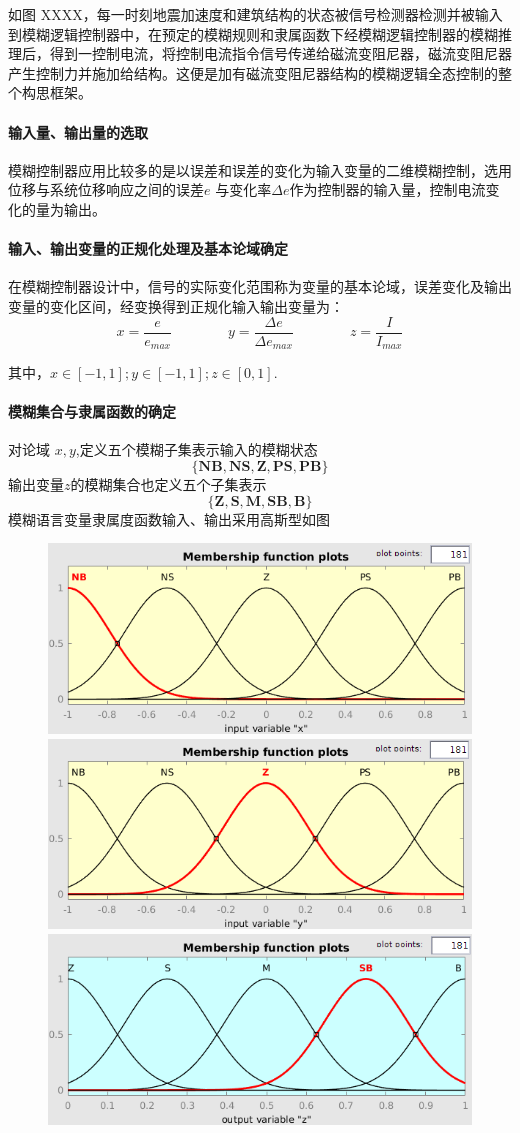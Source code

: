 如图 XXXX，每一时刻地震加速度和建筑结构的状态被信号检测器检测并被输入到模糊逻辑控制器中，在预定的模糊规则和隶属函数下经模糊逻辑控制器的模糊推理后，得到一控制电流，将控制电流指令信号传递给磁流变阻尼器，磁流变阻尼器产生控制力并施加给结构。这便是加有磁流变阻尼器结构的模糊逻辑全态控制的整个构思框架。

\paragraph{输入量、输出量的选取}
\qquad 模糊控制器应用比较多的是以误差和误差的变化为输入变量的二维模糊控制，选用位移与系统位移响应之间的误差$e$ 与变化率$\Delta e$作为控制器的输入量，控制电流变化的量为输出。
\paragraph{输入、输出变量的正规化处理及基本论域确定}
\qquad 在模糊控制器设计中，信号的实际变化范围称为变量的基本论域，误差变化及输出变量的变化区间，经变换得到正规化输入输出变量为：
\[x=\frac{e}{e_{max}}\qquad \qquad y=\frac{\Delta e}{\Delta e_{max}}\qquad \qquad z=\frac{I}{I_{max}}\]

其中，$x\in [-1,1]; y\in [-1,1]; z\in [0,1]$.

\paragraph{模糊集合与隶属函数的确定}
\qquad 对论域 $x,y$,定义五个模糊子集表示输入的模糊状态
\[\mathbf{\lbrace NB,NS,Z,PS,PB\rbrace}\]
输出变量$z$的模糊集合也定义五个子集表示
\[\mathbf{\lbrace Z,S,M,SB,B\rbrace}\]
模糊语言变量隶属度函数输入、输出采用高斯型如图
\begin{figure}[H]
\centering
\includegraphics[width=0.5\linewidth]{figure/fuzzyx}
\includegraphics[width=0.5\linewidth]{figure/fuzzyy}
\includegraphics[width=0.5\linewidth]{figure/fuzzyz}
\end{figure}

